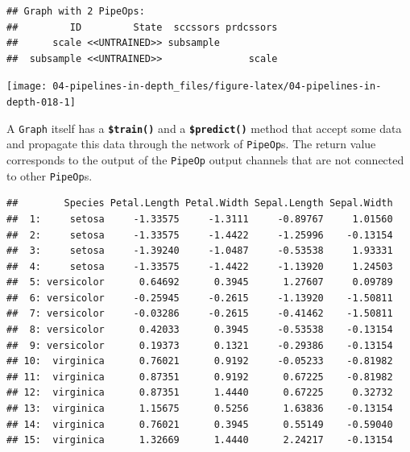 \documentclass[]{scrbook}
\newenvironment{Shaded}{\begin{snugshade}}{\end{snugshade}}
\newcommand{\DataTypeTok}[1]{\textcolor[rgb]{0.13,0.29,0.53}{#1}}
\newcommand{\DecValTok}[1]{\textcolor[rgb]{0.00,0.00,0.81}{#1}}
\newcommand{\KeywordTok}[1]{\textcolor[rgb]{0.13,0.29,0.53}{\textbf{#1}}}
\newcommand{\NormalTok}[1]{#1}
\newcommand{\OperatorTok}[1]{\textcolor[rgb]{0.81,0.36,0.00}{\textbf{#1}}}
\newcommand{\OtherTok}[1]{\textcolor[rgb]{0.56,0.35,0.01}{#1}}
\renewenvironment{Shaded} {\begin{snugshade}\small} {\end{snugshade}}
\begin{document}
\begin{verbatim}
## Graph with 2 PipeOps:
##         ID         State  sccssors prdcssors
##      scale <<UNTRAINED>> subsample          
##  subsample <<UNTRAINED>>               scale
\end{verbatim}

\begin{Shaded}
\end{Shaded}

\begin{center}\texttt{[image: 04-pipelines-in-depth\_files/figure-latex/04-pipelines-in-depth-018-1]} \end{center}

A \texttt{Graph} itself has a \textbf{\texttt{\$train()}} and a \textbf{\texttt{\$predict()}} method that accept some data and propagate this data through the network of \texttt{PipeOp}s.
The return value corresponds to the output of the \texttt{PipeOp} output channels that are not connected to other \texttt{PipeOp}s.

\begin{Shaded}
\end{Shaded}

\begin{verbatim}
##        Species Petal.Length Petal.Width Sepal.Length Sepal.Width
##  1:     setosa     -1.33575     -1.3111     -0.89767     1.01560
##  2:     setosa     -1.33575     -1.4422     -1.25996    -0.13154
##  3:     setosa     -1.39240     -1.0487     -0.53538     1.93331
##  4:     setosa     -1.33575     -1.4422     -1.13920     1.24503
##  5: versicolor      0.64692      0.3945      1.27607     0.09789
##  6: versicolor     -0.25945     -0.2615     -1.13920    -1.50811
##  7: versicolor     -0.03286     -0.2615     -0.41462    -1.50811
##  8: versicolor      0.42033      0.3945     -0.53538    -0.13154
##  9: versicolor      0.19373      0.1321     -0.29386    -0.13154
## 10:  virginica      0.76021      0.9192     -0.05233    -0.81982
## 11:  virginica      0.87351      0.9192      0.67225    -0.81982
## 12:  virginica      0.87351      1.4440      0.67225     0.32732
## 13:  virginica      1.15675      0.5256      1.63836    -0.13154
## 14:  virginica      0.76021      0.3945      0.55149    -0.59040
## 15:  virginica      1.32669      1.4440      2.24217    -0.13154
\end{verbatim}
\end{document}
